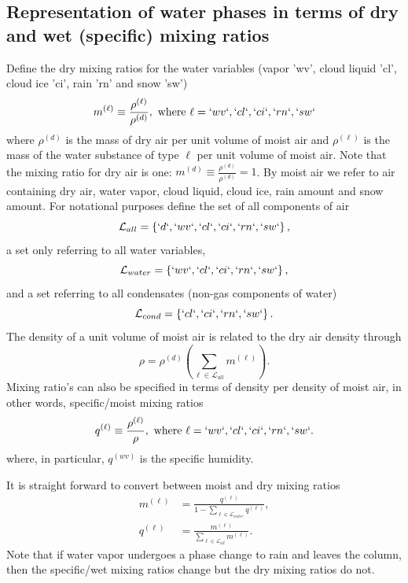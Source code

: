 \documentclass{agujournal}
\begin{document}
{\subsection{Representation of water phases in terms of dry and wet (specific) mixing ratios}\label{sec:mixing_ratios}
Define the dry mixing ratios for the water variables (vapor 'wv', cloud liquid 'cl', cloud ice 'ci', rain 'rn' and snow 'sw')
\begin{equation}
m^{(\ell)}\equiv \frac{\rho^{(\ell)}}{\rho^{(d)}}, \text{ where }\ell=`wv`,`cl`,`ci`,`rn`,`sw`\label{eq:mx}
\end{equation}
where $\rho^{(d)}$ is the mass of dry air per unit volume of moist air and $\rho^{(\ell)}$ is the mass of the water substance of type $\ell$ per unit volume of moist air.  Note that  the mixing ratio for dry air is one: $m^{(d)}\equiv \frac{\rho^{(d)}}{\rho^{(d)}}=1$. 
By moist air we refer to air containing dry air, water vapor, cloud liquid, cloud ice, rain amount and snow amount. For notational purposes define the set of all components of air
\begin{equation}
\mathcal{L}_{all}=\left\{ `d`,`wv`,`cl`,`ci`,`rn`,`sw`\right\},
\end{equation}
a set only referring to all water variables,
\begin{equation}
\mathcal{L}_{water}=\left\{`wv`,`cl`,`ci`,`rn`,`sw`\right\},
\end{equation}
and a set referring to all condensates (non-gas components of water)
\begin{equation}
\mathcal{L}_{cond}=\left\{`cl`,`ci`,`rn`,`sw`\right\}.
\end{equation}
The density of a unit volume of moist air is related to the dry air density through
\begin{equation}
\rho=\rho^{(d)}\left(\sum_{\ell \in \mathcal{L}_{all}} m^{(\ell)}\right).
\end{equation}
Mixing ratio's can also be specified in terms of density per density of moist air, in other words, specific/moist mixing ratios
\begin{equation}
q^{(\ell)}\equiv \frac{\rho^{(\ell)}}{\rho}, \text{ where }\ell=`wv`,`cl`,`ci`,`rn`,`sw`\label{eq:qx}.
\end{equation}
where, in particular, $q^{(wv)}$ is the specific humidity. 


It is straight forward to convert between moist and dry mixing ratios
\begin{align}
m^{(\ell)}&=\frac{q^{(\ell)}}{1-\sum_{\ell \in \mathcal{L}_{water}} q^{(\ell)}},\label{eq:mxqx}\\
q^{(\ell)}&=\frac{m^{(\ell)}}{\sum_{\ell \in \mathcal{L}_{all}} m^{(\ell)}}.
\end{align}
Note that if water vapor undergoes a phase change to rain and leaves the column, then the specific/wet mixing ratios change but the dry mixing ratios do not.


}
\end{document}
